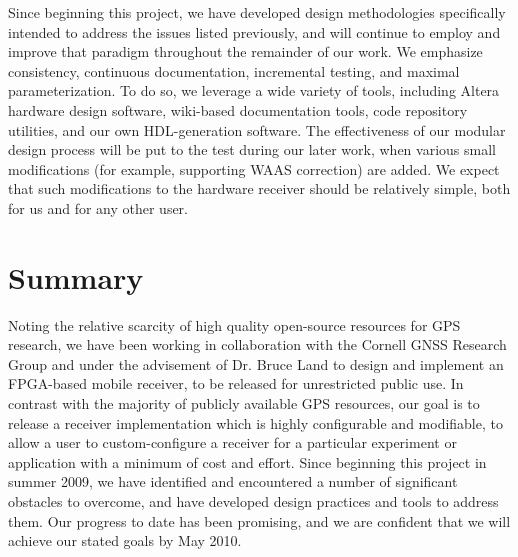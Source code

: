 \documentclass[14pt]{article}
\begin{document}
Since beginning this project, we have developed design
methodologies specifically intended to address the issues listed previously, and will continue to employ
and improve that paradigm throughout the remainder of our work.  We emphasize consistency, continuous
documentation, incremental testing, and maximal parameterization.  To do so, we leverage a wide variety
of tools, including Altera hardware design software, wiki-based documentation tools, code repository
utilities, and our own HDL-generation software.  The effectiveness of our modular design process will be
put to the test during our later work, when various small modifications (for example, supporting WAAS 
correction) are added.  We expect that such modifications to the hardware receiver should be relatively
simple, both for us and for any other user.

\section*{Summary}
Noting the relative scarcity of high quality open-source resources for GPS research, we have been
working in collaboration with the Cornell GNSS Research Group and under the advisement of Dr. Bruce Land 
to design and implement an FPGA-based mobile receiver, to be released for unrestricted public use.
In contrast with the majority of publicly available GPS resources, our goal is to release a receiver
implementation which is highly configurable and modifiable, to allow a user to custom-configure a
receiver for a particular experiment or application with a minimum of cost and effort.  Since beginning
this project in summer 2009, we have identified and encountered a number of significant obstacles to
overcome, and have developed design practices and tools to address them. Our progress to date has been
promising, and we are confident that we will achieve our stated goals by May 2010.
\end{document}
